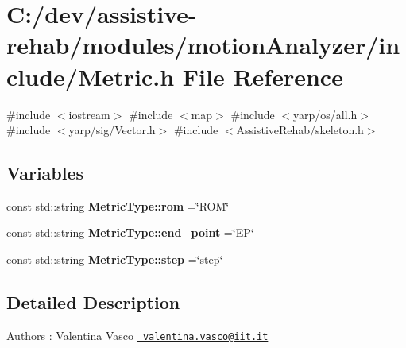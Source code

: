 \section{C\+:/dev/assistive-\/rehab/modules/motion\+Analyzer/include/\+Metric.h File Reference}
\label{Metric_8h}
{\ttfamily \#include $<$iostream$>$}\newline
{\ttfamily \#include $<$map$>$}\newline
{\ttfamily \#include $<$yarp/os/all.\+h$>$}\newline
{\ttfamily \#include $<$yarp/sig/\+Vector.\+h$>$}\newline
{\ttfamily \#include $<$Assistive\+Rehab/skeleton.\+h$>$}\newline
\subsection*{Variables}
\begin{DoxyCompactItemize}
\item 
\mbox{\label{Metric_8h_a134a0ba35a0bfd473142dcba2fa0ac8f}} 
const std\+::string {\bfseries Metric\+Type\+::rom} =\char`\"{}R\+OM\char`\"{}
\item 
\mbox{\label{Metric_8h_ac4580e78dfaef7eb23d717bd230174e4}} 
const std\+::string {\bfseries Metric\+Type\+::end\+\_\+point} =\char`\"{}EP\char`\"{}
\item 
\mbox{\label{Metric_8h_a72bfe667eedeae0fa4a698a4450413d2}} 
const std\+::string {\bfseries Metric\+Type\+::step} =\char`\"{}step\char`\"{}
\end{DoxyCompactItemize}


\subsection{Detailed Description}
\begin{DoxyAuthor}{Authors}
\+: Valentina Vasco \href{mailto:valentina.vasco@iit.it}{\texttt{ valentina.\+vasco@iit.\+it}} 
\end{DoxyAuthor}
